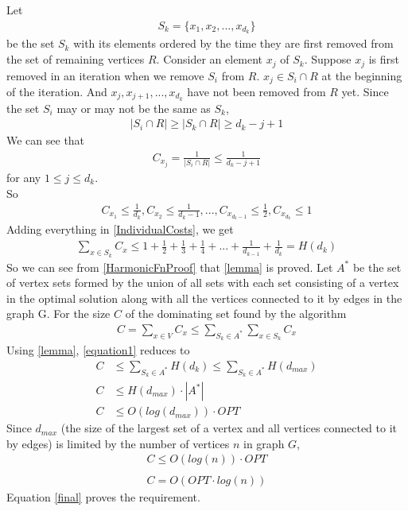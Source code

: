 \documentclass[paper=a4, fontsize=11pt]{scrartcl} %
\numberwithin{figure}{section} %
\numberwithin{table}{section} %
\begin{document}
\begin{enumerate}
Let 
\begin{align*} 
S_k = \{x_1, x_2, ..., x_{d_k}\} 
\end{align*}
be the set $S_k$ with its elements ordered by the time they are first removed from the set of remaining vertices $R$. Consider an element $x_j$ of $S_k$. Suppose  $x_j$ is first removed in an iteration when we remove $S_i$ from $R$. $x_j \in S_i \cap R$ at the beginning of the iteration. And $x_j, x_{j+1}, ..., x_{d_k}$ have not been removed from $R$ yet. Since the set $S_i$ may or may not be the same as $S_k$, 
\begin{align*} 
\left | S_i \cap R \right | \geq \left | S_k \cap R \right | \geq d_k - j + 1
\end{align*}
We can see that
\begin{align*} 
C_{x_j} = \frac{1}{\left | S_i \cap R \right |} \leq \frac{1}{d_k - j + 1} 
\end{align*} for any $1 \leq j \leq d_k$.\\
So
\begin{align} \label{IndividualCosts}
C_{x_1} \leq \frac{1}{d_k}, C_{x_2} \leq \frac{1}{d_k -1},..., C_{x_{d_k -1}} \leq \frac{1}{2}, C_{x_{d_k}} \leq 1
\end{align}
Adding everything in \ref{IndividualCosts}, we get
\begin{align} \label{HarmonicFnProof}
\sum \limits_{x \in S_k} C_x \leq 1 + \frac{1}{2} + \frac{1}{3}+ \frac{1}{4} + ... + \frac{1}{d_{k-1}} + \frac{1}{d_k} = H(d_k)
\end{align}
So we can see from \ref{HarmonicFnProof} that \ref{lemma} is proved. Let $A^*$ be the set of vertex sets formed by the union of all sets with each set consisting of a vertex in the optimal solution along with all the vertices connected to it by edges in the graph G. For the size $C$ of the dominating set found by the algorithm
\begin{align} \label{equation1}
C= \sum \limits_{x \in V} C_x \leq \sum \limits_{S_k \in A^*} \sum \limits_{x \in S_k} C_x
\end{align}
Using \ref{lemma}, \ref{equation1} reduces to
\begin{align*} 
C &\leq \sum \limits_{S_k \in A^*} H(d_k) \leq \sum \limits_{S_k \in A^*} H(d_{max})\\
C &\leq H(d_{max}) \cdot \left | A^* \right |\\
C &\leq O(log(d_{max})) \cdot OPT
\end{align*} 
Since $d_{max}$ (the size of the largest set of a vertex and all vertices connected to it by edges) is limited by the number of vertices $n$ in graph $G$,
\begin{align*} 
C \leq O(log(n)) \cdot OPT\\
\end{align*} 
\begin{align} \label{final}
C = O(OPT \cdot log(n))
\end{align}
Equation \ref{final} proves the requirement.


\end{enumerate}
\end{document}
